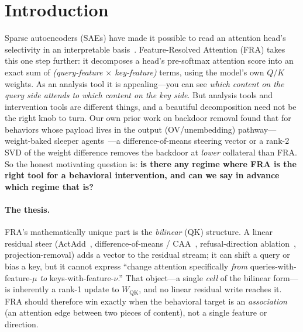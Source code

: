 \documentclass[11pt]{article}
\newcommand{\QK}{\mathrm{QK}}
\theoremstyle{definition}
\theoremstyle{plain}
\theoremstyle{remark}
\begin{document}
\tableofcontents

\section{Introduction}

Sparse autoencoders (SAEs) have made it possible to read an attention head's selectivity in an interpretable basis~\citep{bricken2023monosemanticity,templeton2024scaling,cunningham2023sparse}. Feature-Resolved Attention (FRA) takes this one step further: it decomposes a head's pre-softmax attention score into an exact sum of \emph{(query-feature $\times$ key-feature)} terms, using the model's own $Q/K$ weights. As an analysis tool it is appealing---you can see \emph{which content on the query side attends to which content on the key side}. But analysis tools and intervention tools are different things, and a beautiful decomposition need not be the right knob to turn. Our own prior work on backdoor removal found that for behaviors whose payload lives in the output (OV/unembedding) pathway---weight-baked sleeper agents~\citep{hubinger2024sleeper}---a difference-of-means steering vector or a rank-2 SVD of the weight difference removes the backdoor at \emph{lower} collateral than FRA. So the honest motivating question is: \textbf{is there any regime where FRA is the right tool for a behavioral intervention, and can we say in advance which regime that is?}

\paragraph{The thesis.} FRA's mathematically unique part is the \emph{bilinear} (QK) structure. A linear residual steer (ActAdd~\citep{turner2023actadd}, difference-of-means / CAA~\citep{rimsky2024caa}, refusal-direction ablation~\citep{arditi2024refusal}, projection-removal) adds a vector to the residual stream; it can shift a query or bias a key, but it cannot express ``change attention specifically \emph{from} queries-with-feature-$\mu$ \emph{to} keys-with-feature-$\nu$.'' That object---a single \emph{cell} of the bilinear form---is inherently a rank-1 update to $W_{\QK}$, and no linear residual write reaches it. FRA should therefore win exactly when the behavioral target is an \emph{association} (an attention edge between two pieces of content), not a single feature or direction.
\end{document}
